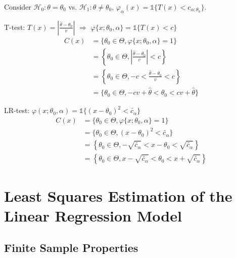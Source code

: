 \documentclass{article}
\begin{document}
Consider $\mathcal{H}_0 : \theta = \theta_0$ vs. $\mathcal{H}_1 : \theta \neq
\theta_0$, $\varphi_{\alpha} (x) = \mathbb{1} \{ T (x) < c_{\alpha ; \theta_0}
\}$.

\begin{example}
  T-test: $T (x) = \left| \frac{\hat{\theta} - \theta_0}{v} \right|$
  $\Rightarrow$ $\varphi \{ x ; \theta_0, \alpha \} = \mathbb{1} \{ T (x) < c
  \}$
  \begin{align*}
    C (x) & = \{ \theta_0 \in \Theta, \varphi \{ x ; \theta_0, \alpha \} = 1
    \}\\
    & = \left\{ \theta_0 \in \Theta, \left| \frac{\hat{\theta} -
    \theta_0}{v} \right| < c \right\}\\
    & = \left\{ \theta_0 \in \Theta, - c < \frac{\hat{\theta} -
    \theta_0}{v} < c \right\}\\
    & = \{ \theta_0 \in \Theta, - c v + \hat{\theta} < \theta_0 < c v +
    \hat{\theta} \}
  \end{align*}
\end{example}

\begin{example}
  LR-test: $\varphi (x ; \theta_0, \alpha) = \mathbb{1} \{ (x - \theta_0)^2 <
  \widetilde{c_{\alpha}} \}$
  \begin{align*}
    C (x) & = \{ \theta_0 \in \Theta, \varphi \{ x ; \theta_0, \alpha \} = 1
    \}\\
    & = \{ \theta_0 \in \Theta, (x - \theta_0)^2 < \widetilde{c_{\alpha}}
    \}\\
    & = \left\{ \theta_0 \in \Theta, - \sqrt{\widetilde{c_{\alpha}}} < x -
    \theta_0 < \sqrt{\widetilde{c_{\alpha}}} \right\}\\
    & = \left\{ \theta_0 \in \Theta, x - \sqrt{\widetilde{c_{\alpha}}} <
    \theta_0 < x + \sqrt{\widetilde{c_{\alpha}}} \right\}
  \end{align*}
\end{example}

\section{Least Squares Estimation of the Linear Regression Model}

\subsection{Finite Sample Properties}
\end{document}
